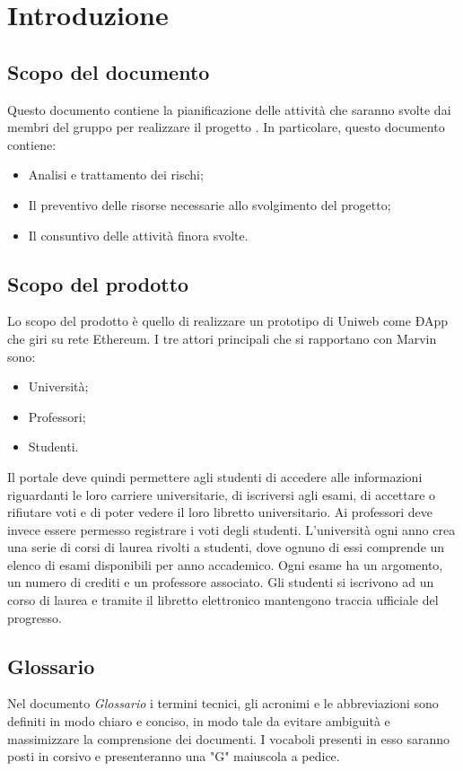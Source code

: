 \newpage
\section{Introduzione}
\subsection{Scopo del documento}
Questo documento contiene la pianificazione delle attività che saranno svolte dai membri del gruppo \Gruppo{} per realizzare il progetto \NomeProgetto. In particolare, questo documento contiene:

\begin{itemize}
	\item Analisi e trattamento dei rischi;
	\item Il preventivo delle risorse necessarie allo svolgimento del progetto;
	\item Il consuntivo delle attività finora svolte.
\end{itemize}

\subsection{Scopo del prodotto}
Lo scopo del prodotto è quello di realizzare un prototipo di Uniweb come ÐApp che giri su rete Ethereum. I tre attori principali che si rapportano con Marvin sono:
\begin{itemize}
	\item Università;
	\item Professori;
	\item Studenti.
\end{itemize} 
Il portale deve quindi permettere agli studenti di accedere alle informazioni riguardanti le loro carriere universitarie, di iscriversi agli esami, di accettare o rifiutare voti e di poter vedere il loro libretto universitario.
Ai professori deve invece essere permesso registrare i voti degli studenti.
L'università ogni anno crea una serie di corsi di laurea rivolti a studenti, dove ognuno di essi comprende un elenco di esami disponibili per anno accademico. Ogni esame ha un argomento, un numero di crediti e un professore associato. Gli studenti si iscrivono ad un corso di laurea e tramite il libretto elettronico mantengono traccia ufficiale del progresso.

\subsection{Glossario}
Nel documento \textit{Glossario} i termini tecnici, gli acronimi e le abbreviazioni sono definiti in modo chiaro e conciso, in modo tale da evitare ambiguità e massimizzare la comprensione dei documenti.
\newline I vocaboli presenti in esso saranno posti in corsivo e presenteranno una "G" maiuscola a pedice.

